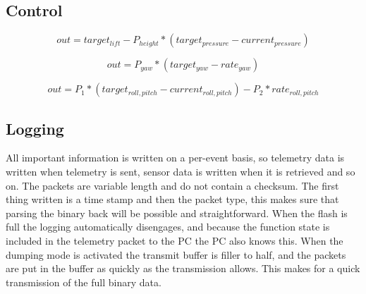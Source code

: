 \documentclass[final]{article}
\begin{document}
\subsection{Control}

\begin{equation}
out = target_{lift} - P_{height} * (target_{pressure} - current_{pressure})
\label{eq:control-height}
\end{equation}

\begin{equation}
out = P_{yaw} * (target_{yaw} - rate_{yaw})
\label{eq:control-yaw}
\end{equation}

\begin{equation}
out = P_1 * (target_{roll,pitch} - current_{roll,pitch}) - P_2 * rate_{roll,pitch}
\label{eq:control-roll-pitch}
\end{equation}


\subsection{Logging}
All important information is written on a per-event basis, so telemetry data is written when telemetry is sent, sensor data is written when it is retrieved and so on.
The packets are variable length and do not contain a checksum.
The first thing written is a time stamp and then the packet type, this makes sure that parsing the binary back will be possible and straightforward.
When the flash is full the logging automatically disengages, and because the function state is included in the telemetry packet to the PC the PC also knows this.
When the dumping mode is activated the transmit buffer is filler to half, and the packets are put in the buffer as quickly as the transmission allows.
This makes for a quick transmission of the full binary data.
\end{document}
